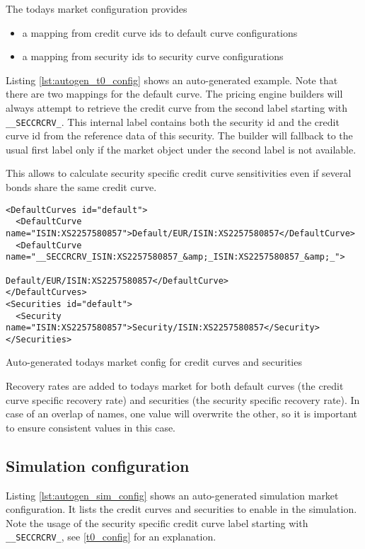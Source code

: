 \documentclass[12pt, a4paper]{article}
\begin{document}
The todays market configuration provides 

\begin{itemize}
\item a mapping from credit curve ids to default curve configurations
\item a mapping from security ids to security curve configurations
\end{itemize}

Listing \ref{lst:autogen_t0_config} shows an auto-generated example. Note that there are two mappings for the default
curve. The pricing engine builders will always attempt to retrieve the credit curve from the second label starting with
\verb+__SECCRCRV_+. This internal label contains both the security id and the credit curve id from the reference data of
this security. The builder will fallback to the usual first label only if the market object under the second label is
not available.

This allows to calculate security specific credit curve sensitivities even if several bonds share the same credit curve.

\begin{listing}[H]
\begin{verbatim}
<DefaultCurves id="default">
  <DefaultCurve name="ISIN:XS2257580857">Default/EUR/ISIN:XS2257580857</DefaultCurve>
  <DefaultCurve name="__SECCRCRV_ISIN:XS2257580857_&amp;_ISIN:XS2257580857_&amp;_">
                                         Default/EUR/ISIN:XS2257580857</DefaultCurve>
</DefaultCurves>
<Securities id="default">
  <Security name="ISIN:XS2257580857">Security/ISIN:XS2257580857</Security>
</Securities>
\end{verbatim}
\caption{Auto-generated todays market config for credit curves and securities}
\label{lst:autogen_t0_config}
\end{listing}

Recovery rates are added to todays market for both default curves (the credit curve specific recovery rate) and
securities (the security specific recovery rate). In case of an overlap of names, one value will overwrite the other, so
it is important to ensure consistent values in this case.

\subsection{Simulation configuration}\label{sim_config}

Listing \ref{lst:autogen_sim_config} shows an auto-generated simulation market configuration. It lists the credit curves
and securities to enable in the simulation. Note the usage of the security specific credit curve label starting with
\verb+__SECCRCRV_+, see \ref{t0_config} for an explanation.
\end{document}
